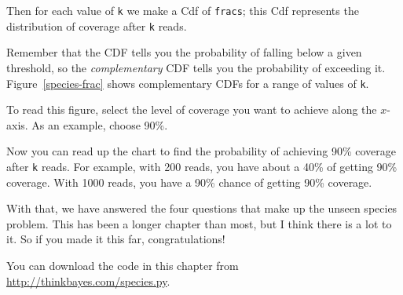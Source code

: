 \documentclass[12pt]{book}
\begin{document}
Then for each value of {\tt k} we make a Cdf of {\tt fracs}; this Cdf
represents the distribution of coverage after {\tt k} reads.

Remember that the CDF tells you the probability of falling below a
given threshold, so the {\em complementary} CDF tells you the
probability of exceeding it.  Figure~\ref{species-frac} shows
complementary CDFs for a range of values of {\tt k}.

To read this figure, select the level of coverage you want to achieve
along the $x$-axis.  As an example, choose 90\%.

Now you can read up the chart to find the probability of achieving
90\% coverage after {\tt k} reads.  For example, with 200 reads,
you have about a 40\% of getting 90\% coverage.  With 1000 reads, you
have a 90\% chance of getting 90\% coverage.

With that, we have answered the four questions that make up the unseen
species problem.  This has been a longer chapter than most, but I
think there is a lot to it.  So if you made it this far,
congratulations!

You can download the code in this chapter from
\url{http://thinkbayes.com/species.py}.










\end{document}
